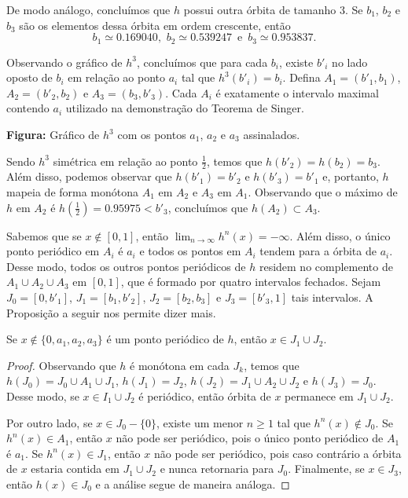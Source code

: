 De modo análogo, concluímos que $h$ possui outra órbita de tamanho $3$. Se $b_1$, $b_2$ e $b_3$ são os elementos dessa órbita em ordem crescente, então
$$b_1 \simeq 0.169040 \text{, } \, b_2 \simeq 0.539247 \,  \text{ e } \, b_3 \simeq 0.953837.$$

Observando o gráfico de $h^3$, concluímos que para cada $b_i$, existe $b'_i$ no lado oposto de $b_i$ em relação ao ponto $a_i$ tal que $h^3(b'_i) = b_i$. Defina $A_1 = (b'_1, b_1)$, $A_2 = (b'_2, b_2)$ e $A_3 = (b_3, b'_3)$. Cada $A_i$ é exatamente o intervalo maximal contendo $a_i$ utilizado na demonstração do Teorema de Singer.

\begin{center}
{\small \textbf{Figura:} Gráfico de $h^3$ com os pontos $a_1$, $a_2$ e $a_3$ assinalados.}
\end{center}

Sendo $h^3$ simétrica em relação ao ponto $\frac{1}{2}$, temos que $h(b'_2) = h(b_2) = b_3$.
Além disso, podemos observar que $h(b'_1) = b'_2$ e $h(b'_3) = b'_1$ e, portanto, $h$ mapeia de forma monótona $A_1$ em $A_2$ e $A_3$ em $A_1$. Observando que o máximo de $h$ em $A_2$ é $h( \frac{1}{2}) = 0.95975 < b'_3$, concluímos que $h(A_2) \subset A_3$.

Sabemos que se $x \notin [0, 1]$, então $\lim_{n \to \infty} h^n(x) = -\infty$.
Além disso, o único ponto periódico em $A_i$ é $a_i$ e todos os pontos em $A_i$ tendem para a órbita de $a_i$.
Desse modo, todos os outros pontos periódicos de $h$ residem no complemento de $A_1 \cup A_2 \cup A_3$ em $[0, 1]$, que é formado por quatro intervalos fechados. Sejam $J_0 = [0, b'_1]$, $J_1 = [b_1, b'_2]$, $J_2 = [b_2, b_3]$ e $J_3 = [b'_3, 1]$ tais intervalos. A Proposição a seguir nos permite dizer mais.

\begin{proposition}
Se $x \notin \lbrace 0, a_1, a_2, a_3 \rbrace$ é um ponto periódico de $h$, então $x \in J_1 \cup J_2$.
\end{proposition}

\begin{proof}
Observando que $h$ é monótona em cada $J_k$, temos que $h(J_0) = J_0 \cup A_1 \cup J_1$, $h(J_1) = J_2$, $h(J_2) = J_1 \cup A_2 \cup J_2$ e $h(J_3) = J_0$. Desse modo, se $x \in I_1 \cup J_2$ é periódico, então órbita de $x$ permanece em $J_1 \cup J_2$.

Por outro lado, se $x \in J_0 - \lbrace 0 \rbrace$, existe um menor $n \geq 1$ tal que $h^n(x) \notin J_0$. Se $h^n(x) \in A_1$, então $x$ não pode ser periódico, pois o único ponto periódico de $A_1$ é $a_1$.
Se $h^n(x) \in J_1$, então $x$ não pode ser periódico, pois caso contrário a órbita de $x$ estaria contida em $J_1 \cup J_2$ e nunca retornaria para $J_0$.
Finalmente, se $x \in J_3$, então $h(x) \in J_0$ e a análise segue de maneira análoga.
\end{proof}

